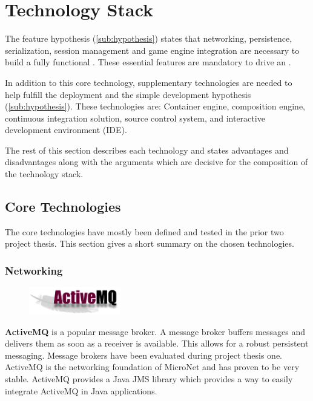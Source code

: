 \section{Technology Stack}

The feature hypothesis (\autoref{sub:hypothesis}) states that networking,
persistence, serialization, session management and game engine integration are
necessary to build a fully functional \og{}. These essential features are
mandatory to drive an \og{}.

In addition to this core technology, supplementary technologies are needed to
help fulfill the deployment and the simple development hypothesis
(\autoref{sub:hypothesis}). These technologies are: Container engine,
composition engine, continuous integration solution, source control system, and
interactive development environment (IDE).

The rest of this section describes each technology and states advantages and
disadvantages along with the arguments which are decisive for the composition
of the technology stack.

\subsection{Core Technologies}

The core technologies have mostly been defined and tested in the prior two
project thesis. This section gives a short summary on the chosen technologies.

\subsubsection{Networking}

\begin{figure}
    \includegraphics[width=4cm]{images/dependencies/activemq}
\end{figure}

\textbf{ActiveMQ} is a popular message broker. A message broker buffers
messages and delivers them as soon as a receiver is available. This allows for a
robust persistent messaging. Message brokers have been evaluated during
project thesis one. ActiveMQ is the networking foundation of MicroNet and
has proven to be very stable. ActiveMQ provides a Java JMS library which
provides a way to easily integrate ActiveMQ in Java applications.

